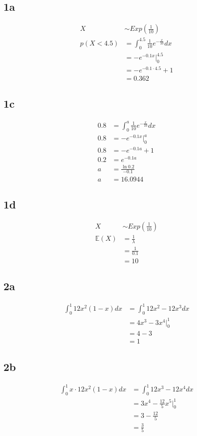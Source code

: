 \documentclass{article}
\begin{document}
\subsection*{1a}
\begin{align*}
X &\sim Exp(\frac{1}{10})\\
p(X<4.5) &= \int_{0}^{4.5} \frac{1}{10}e^{-\frac{x}{10}}dx\\
&= -e^{-0.1x} \Big|_0^{4.5}\\
&= -e^{-0.1 \cdot 4.5} + 1\\
&= 0.362
\end{align*}


\subsection*{1c}
\begin{align*}
0.8 &= \int_{0}^{a} \frac{1}{10}e^{-\frac{x}{10}}dx\\
0.8 &= -e^{-0.1x} \Big|_0^{a}\\
0.8 &= -e^{-0.1a} + 1\\
0.2 &= e^{-0.1a}\\
a &= \frac{\ln0.2}{-0.1}\\
a &= 16.0944
\end{align*}


\subsection*{1d}
\begin{align*}
	X &\sim Exp(\frac{1}{10})\\
	\mathbb{E}(X) &= \frac{1}{\lambda}\\
								&= \frac{1}{0.1} \\
								&= 10
\end{align*}


\subsection*{2a}
\begin{align*}
\int_{0}^{1} 12x^2(1-x)dx &= \int_{0}^{1} 12x^2-12x^3dx\\
													&= 4x^3 - 3x^4 \Big|_0^1\\
													&= 4 - 3\\
													&= 1
\end{align*}


\subsection*{2b}
\begin{align*}
	\int_{0}^{1} x\cdot12x^2(1-x)dx &= \int_{0}^{1} 12x^3-12x^4dx\\
																	&= 3x^4 - \frac{12}{5}x^5 \Big|_0^1\\
																	&= 3 - \frac{12}{5}\\
																	&= \frac{3}{5}
\end{align*}
\end{document}
